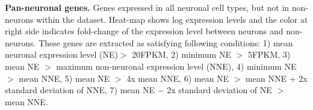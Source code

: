 \textbf{Pan-neuronal genes.} 
Genes expressed in all neuronal cell types, but not in non-neurons within the dataset. Heat-map shows log expression levels and the color at right side indicates fold-change of the expression level between neurons and non-neurons. These genes are extracted as satisfying following conditions: 1) mean neuronal expression level (NE)$>$ 20FPKM, 2) minimum NE $>$ 5FPKM, 3) mean NE $>$ maximum non-neuronal expression level (NNE), 4) minimum NE $>$ mean NNE, 5) mean NE $>$ 4x mean NNE, 6) mean NE $>$ mean NNE $+$ 2x standard deviation of NNE, 7) mean NE $-$ 2x standard deviation of NE $>$ mean NNE. 



